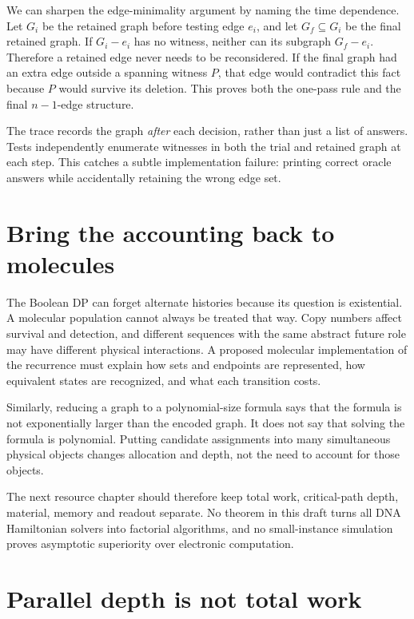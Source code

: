 We can sharpen the edge-minimality argument by naming the time
dependence. Let \(G_i\) be the retained graph before testing edge
\(e_i\), and let \(G_f\subseteq G_i\) be the final retained graph. If
\(G_i-e_i\) has no witness, neither can its subgraph \(G_f-e_i\).
Therefore a retained edge never needs to be reconsidered. If the final
graph had an extra edge outside a spanning witness \(P\), that edge
would contradict this fact because \(P\) would survive its deletion.
This proves both the one-pass rule and the final \(n-1\)-edge structure.

The trace records the graph \emph{after} each decision, rather than just
a list of answers. Tests independently enumerate witnesses in both the
trial and retained graph at each step. This catches a subtle
implementation failure: printing correct oracle answers while
accidentally retaining the wrong edge set.

\section{Bring the accounting back to
molecules}\label{bring-the-accounting-back-to-molecules}

The Boolean DP can forget alternate histories because its question is
existential. A molecular population cannot always be treated that way.
Copy numbers affect survival and detection, and different sequences with
the same abstract future role may have different physical interactions.
A proposed molecular implementation of the recurrence must explain how
sets and endpoints are represented, how equivalent states are
recognized, and what each transition costs.

Similarly, reducing a graph to a polynomial-size formula says that the
formula is not exponentially larger than the encoded graph. It does not
say that solving the formula is polynomial. Putting candidate
assignments into many simultaneous physical objects changes allocation
and depth, not the need to account for those objects.

The next resource chapter should therefore keep total work,
critical-path depth, material, memory and readout separate. No theorem
in this draft turns all DNA Hamiltonian solvers into factorial
algorithms, and no small-instance simulation proves asymptotic
superiority over electronic computation.

\section{Parallel depth is not total
work}\label{parallel-depth-is-not-total-work}

